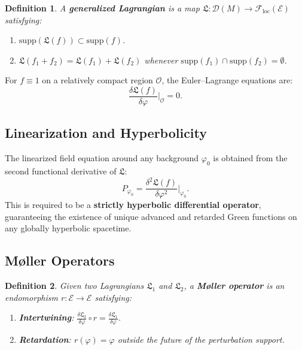 \documentclass[11pt,a4paper]{article}
\newtheorem{definition}{Definition}[section]
\begin{document}
\begin{definition}
A \textbf{generalized Lagrangian} is a map $\mathfrak{L}: \mathcal{D}(M) \to
\mathcal{F}_{\mathrm{loc}}(\mathcal{E})$ satisfying:
\begin{enumerate}[nosep]
  \item $\mathrm{supp}(\mathfrak{L}(f)) \subset \mathrm{supp}(f)$.
  \item $\mathfrak{L}(f_1 + f_2) = \mathfrak{L}(f_1) + \mathfrak{L}(f_2)$
        whenever $\mathrm{supp}(f_1) \cap \mathrm{supp}(f_2) = \emptyset$.
\end{enumerate}
\end{definition}

For $f \equiv 1$ on a relatively compact region $\mathcal{O}$, the
Euler--Lagrange equations are:
\begin{equation}
  \frac{\delta \mathfrak{L}(f)}{\delta \varphi}\bigg|_\mathcal{O} = 0.
\end{equation}

\subsection{Linearization and Hyperbolicity}

The linearized field equation around any background $\varphi_0$ is obtained
from the second functional derivative of $\mathfrak{L}$:
\begin{equation}
  P_{\varphi_0} = \frac{\delta^2 \mathfrak{L}(f)}{\delta\varphi^2}\bigg|_{\varphi_0}.
\end{equation}
This is required to be a \textbf{strictly hyperbolic differential operator},
guaranteeing the existence of unique advanced and retarded Green functions
on any globally hyperbolic spacetime.

\subsection{M\o ller Operators}

\begin{definition}
Given two Lagrangians $\mathfrak{L}_1$ and $\mathfrak{L}_2$, a \textbf{M\o ller
operator} is an endomorphism $r: \mathcal{E} \to \mathcal{E}$ satisfying:
\begin{enumerate}[nosep]
  \item \textbf{Intertwining}: $\frac{\delta \mathfrak{L}_2}{\delta\varphi}
        \circ r = \frac{\delta \mathfrak{L}_1}{\delta\varphi}$.
  \item \textbf{Retardation}: $r(\varphi) = \varphi$ outside the future
        of the perturbation support.
\end{enumerate}
\end{definition}
\end{document}
